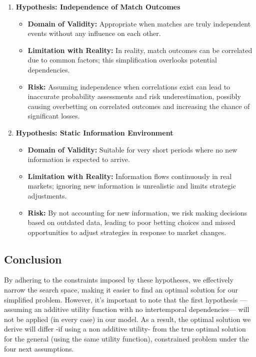 \begin{enumerate}
    \item \textbf{Hypothesis: Independence of Match Outcomes}
        \begin{itemize}
            \item \textbf{Domain of Validity:} Appropriate when matches are truly independent events without any influence on each other.
            \item \textbf{Limitation with Reality:} In reality, match outcomes can be correlated due to common factors; this simplification overlooks potential dependencies.
            \item \textbf{Risk:} Assuming independence when correlations exist can lead to inaccurate probability assessments and risk underestimation, possibly causing overbetting on correlated outcomes and increasing the chance of significant losses.
        \end{itemize}

    \item \textbf{Hypothesis: Static Information Environment}
        \begin{itemize}
            \item \textbf{Domain of Validity:} Suitable for very short periods where no new information is expected to arrive.
            \item \textbf{Limitation with Reality:} Information flows continuously in real markets; ignoring new information is unrealistic and limits strategic adjustments.
            \item \textbf{Risk:} By not accounting for new information, we risk making decisions based on outdated data, leading to poor betting choices and missed opportunities to adjust strategies in response to market changes.
        \end{itemize}

\end{enumerate}

\subsection{Conclusion}

By adhering to the constraints imposed by these hypotheses, we effectively narrow the search space, making it easier to find an optimal solution for our simplified problem. However, it's important to note that the first hypothesis —assuming an additive utility function with no intertemporal dependencies— will not be applied (in every case) in our model. As a result, the optimal solution we derive will differ -if using a non additive utility- from the true optimal solution for the general (using the same utility function), constrained problem under the four next assumptions.


